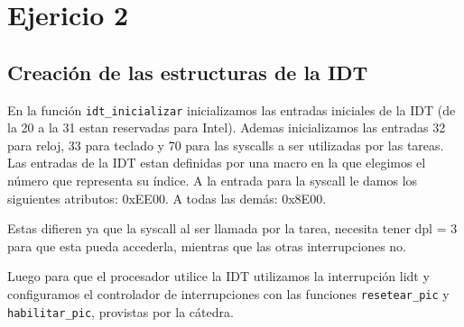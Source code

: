 \section{Ejericio 2}

\subsection{Creación de las estructuras de la IDT} 

En la función \texttt{idt\_inicializar} inicializamos las entradas iniciales de la IDT (de la 20 a la 31 estan reservadas para Intel).
Ademas inicializamos las entradas 32 para reloj, 33 para teclado y 70 para las syscalls a ser utilizadas por las tareas.
Las entradas de la IDT estan definidas por una macro en la que elegimos el número que representa su índice. 
A la entrada para la syscall le damos los siguientes atributos: 0xEE00.
A todas las demás: 0x8E00.


Estas difieren ya que la syscall al ser llamada por la tarea, necesita tener dpl = 3 para que esta pueda accederla, mientras que las otras interrupciones no.

Luego para que el procesador utilice la IDT utilizamos la interrupción lidt y configuramos el controlador de interrupciones con las funciones \texttt{resetear\_pic} y \texttt{habilitar\_pic}, provistas por la cátedra.